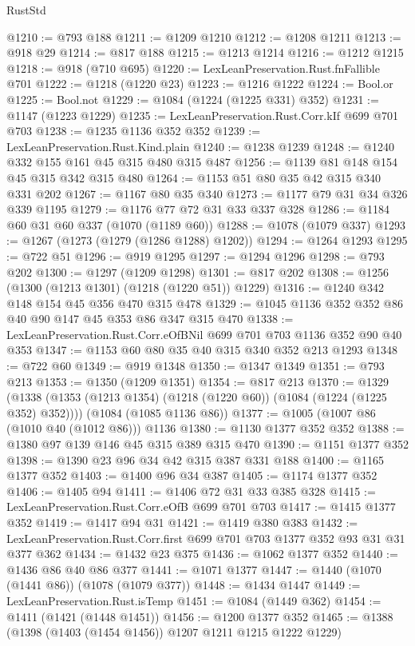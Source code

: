 \begin{lexlean}{RustStd}
\begin{coremodule}
@1210 := @793 @188
@1211 := @1209 @1210
@1212 := @1208 @1211
@1213 := @918 @29
@1214 := @817 @188
@1215 := @1213 @1214
@1216 := @1212 @1215
@1218 := @918 (@710 @695)
@1220 := LexLeanPreservation.Rust.fnFallible @701
@1222 := @1218 (@1220 @23)
@1223 := @1216 @1222
@1224 := Bool.or
@1225 := Bool.not
@1229 := @1084 (@1224 (@1225 @331) @352)
@1231 := @1147 (@1223 @1229)
@1235 := LexLeanPreservation.Rust.Corr.kIf @699 @701 @703
@1238 := @1235 @1136 @352 @352
@1239 := LexLeanPreservation.Rust.Kind.plain
@1240 := @1238 @1239
@1248 := @1240 @332 @155 @161 @45 @315 @480 @315 @487
@1256 := @1139 @81 @148 @154 @45 @315 @342 @315 @480
@1264 := @1153 @51 @80 @35 @42 @315 @340 @331 @202
@1267 := @1167 @80 @35 @340
@1273 := @1177 @79 @31 @34 @326 @339 @1195
@1279 := @1176 @77 @72 @31 @33 @337 @328
@1286 := @1184 @60 @31 @60 @337 (@1070 (@1189 @60))
@1288 := @1078 (@1079 @337)
@1293 := @1267 (@1273 (@1279 (@1286 @1288) @1202))
@1294 := @1264 @1293
@1295 := @722 @51
@1296 := @919 @1295
@1297 := @1294 @1296
@1298 := @793 @202
@1300 := @1297 (@1209 @1298)
@1301 := @817 @202
@1308 := @1256 (@1300 (@1213 @1301) (@1218 (@1220 @51)) @1229)
@1316 := @1240 @342 @148 @154 @45 @356 @470 @315 @478
@1329 := @1045 @1136 @352 @352 @86 @40 @90 @147 @45 @353 @86 @347 @315 @470
@1338 := LexLeanPreservation.Rust.Corr.eOfBNil @699 @701 @703 @1136 @352 @90 @40 @353
@1347 := @1153 @60 @80 @35 @40 @315 @340 @352 @213 @1293
@1348 := @722 @60
@1349 := @919 @1348
@1350 := @1347 @1349
@1351 := @793 @213
@1353 := @1350 (@1209 @1351)
@1354 := @817 @213
@1370 := @1329
    (@1338 (@1353 (@1213 @1354) (@1218 (@1220 @60)) (@1084 (@1224 (@1225 @352) @352))))
    (@1084 (@1085 @1136 @86))
@1377 := @1005 (@1007 @86 (@1010 @40 (@1012 @86))) @1136
@1380 := @1130 @1377 @352 @352
@1388 := @1380 @97 @139 @146 @45 @315 @389 @315 @470
@1390 := @1151 @1377 @352
@1398 := @1390 @23 @96 @34 @42 @315 @387 @331 @188
@1400 := @1165 @1377 @352
@1403 := @1400 @96 @34 @387
@1405 := @1174 @1377 @352
@1406 := @1405 @94
@1411 := @1406 @72 @31 @33 @385 @328
@1415 := LexLeanPreservation.Rust.Corr.eOfB @699 @701 @703
@1417 := @1415 @1377 @352
@1419 := @1417 @94 @31
@1421 := @1419 @380 @383
@1432 := LexLeanPreservation.Rust.Corr.first @699 @701 @703 @1377 @352 @93 @31 @31 @377 @362
@1434 := @1432 @23 @375
@1436 := @1062 @1377 @352
@1440 := @1436 @86 @40 @86 @377
@1441 := @1071 @1377
@1447 := @1440 (@1070 (@1441 @86)) (@1078 (@1079 @377))
@1448 := @1434 @1447
@1449 := LexLeanPreservation.Rust.isTemp
@1451 := @1084 (@1449 @362)
@1454 := @1411 (@1421 (@1448 @1451))
@1456 := @1200 @1377 @352
@1465 := @1388 (@1398 (@1403 (@1454 @1456)) @1207 @1211 @1215 @1222 @1229)

\end{coremodule}
\end{lexlean}
